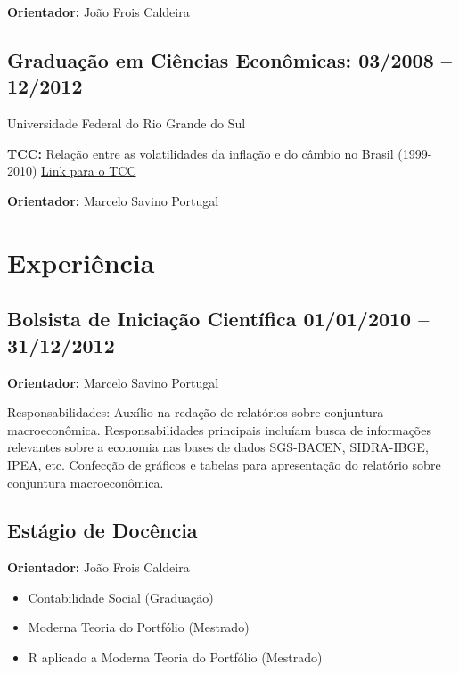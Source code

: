 \documentclass[10pt,a4paper]{article}
\newcommand{\ufrgs}{{Universidade Federal do Rio Grande do Sul}}
\begin{document}
\textbf{Orientador:} João Frois Caldeira

\vspace{-1 em}
\subsection{Graduação em Ciências Econômicas: 03/2008 -- 12/2012}
\ufrgs{}


\textbf{TCC:}
Relação entre as volatilidades da inflação e do câmbio no Brasil (1999-2010)
\href{http://www.lume.ufrgs.br/handle/10183/38307}{Link para o TCC}

\textbf{Orientador:} Marcelo Savino Portugal

\vspace{-1.5 em}
\section{Experiência}

\subsection{Bolsista de Iniciação Científica 01/01/2010 -- 31/12/2012}
\textbf{Orientador:} Marcelo Savino Portugal

Responsabilidades: Auxílio na redação de relatórios sobre conjuntura macroeconômica.
Responsabilidades principais incluíam busca de informações relevantes sobre a economia nas bases de dados SGS-BACEN, SIDRA-IBGE, IPEA, etc.
Confecção de gráficos e tabelas para apresentação do relatório sobre conjuntura macroeconômica.

\vspace{-1 em}
\subsection{Estágio de Docência}

\textbf{Orientador:} João Frois Caldeira \vspace{-6pt}
\begin{itemize}[noitemsep]

\item
Contabilidade Social (Graduação)

\item
Moderna Teoria do Portfólio (Mestrado)

\item
R aplicado a Moderna Teoria do Portfólio (Mestrado)
\end{itemize}
\end{document}
